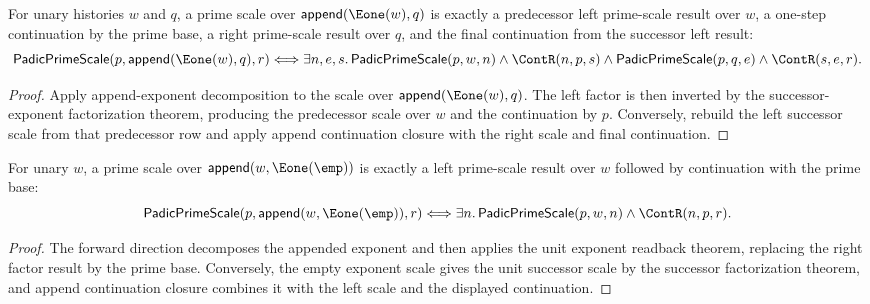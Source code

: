 \begin{theorem}
\label{thm:padic-prime-scale-append-succ-left-factorization}
For unary histories $w$ and $q$, a prime scale over
$\mathsf{append}(\Eone(w),q)$ is exactly a predecessor left prime-scale result
over $w$, a one-step continuation by the prime base, a right prime-scale
result over $q$, and the final continuation from the successor left result:
$$
\mathsf{PadicPrimeScale}(p,\mathsf{append}(\Eone(w),q),r)
\Longleftrightarrow
\exists n,e,s.\,
\mathsf{PadicPrimeScale}(p,w,n)\land
\ContR(n,p,s)\land
\mathsf{PadicPrimeScale}(p,q,e)\land
\ContR(s,e,r).
$$
\end{theorem}
\begin{proof}
Apply append-exponent decomposition to the scale over
$\mathsf{append}(\Eone(w),q)$. The left factor is then inverted by the
successor-exponent factorization theorem, producing the predecessor scale over
$w$ and the continuation by $p$. Conversely, rebuild the left successor scale
from that predecessor row and apply append continuation closure with the
right scale and final continuation.
\end{proof}

\begin{theorem}
\label{thm:padic-prime-scale-append-unit-right-factorization}
For unary $w$, a prime scale over $\mathsf{append}(w,\Eone(\emp))$ is exactly a
left prime-scale result over $w$ followed by continuation with the prime base:
$$
\mathsf{PadicPrimeScale}(p,\mathsf{append}(w,\Eone(\emp)),r)
\Longleftrightarrow
\exists n.\,\mathsf{PadicPrimeScale}(p,w,n)\land\ContR(n,p,r).
$$
\end{theorem}
\begin{proof}
The forward direction decomposes the appended exponent and then applies the unit
exponent readback theorem, replacing the right factor result by the prime base.
Conversely, the empty exponent scale gives the unit successor scale by the
successor factorization theorem, and append continuation closure combines it
with the left scale and the displayed continuation.
\end{proof}

